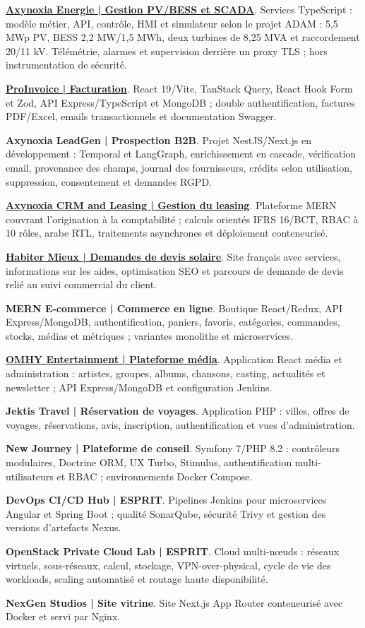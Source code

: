 \documentclass[11pt,a4paper]{article}
\newcommand{\project}[2]{\Needspace{3\baselineskip}\textbf{#1}. #2\par}
\begin{document}
\project{\href{https://energie.products.axynoxia.com}{Axynoxia Energie | Gestion PV/BESS et SCADA}}{Services TypeScript : modèle métier, API, contrôle, HMI et simulateur selon le projet ADAM : 5,5 MWp PV, BESS 2,2 MW/1,5 MWh, deux turbines de 8,25 MVA et raccordement 20/11 kV. Télémétrie, alarmes et supervision derrière un proxy TLS ; hors instrumentation de sécurité.}
\project{\href{https://invoice.products.axynoxia.com}{ProInvoice | Facturation}}{React 19/Vite, TanStack Query, React Hook Form et Zod, API Express/TypeScript et MongoDB ; double authentification, factures PDF/Excel, emails transactionnels et documentation Swagger.}
\project{Axynoxia LeadGen | Prospection B2B}{Projet NestJS/Next.js en développement : Temporal et LangGraph, enrichissement en cascade, vérification email, provenance des champs, journal des fournisseurs, crédits selon utilisation, suppression, consentement et demandes RGPD.}
\project{\href{https://crm-leasing.products.axynoxia.com}{Axynoxia CRM and Leasing | Gestion du leasing}}{Plateforme MERN couvrant l’origination à la comptabilité ; calculs orientés IFRS 16/BCT, RBAC à 10 rôles, arabe RTL, traitements asynchrones et déploiement conteneurisé.}
\project{\href{https://habiter-mieux.info/}{Habiter Mieux | Demandes de devis solaire}}{Site français avec services, informations sur les aides, optimisation SEO et parcours de demande de devis relié au suivi commercial du client.}
\project{MERN E-commerce | Commerce en ligne}{Boutique React/Redux, API Express/MongoDB, authentification, paniers, favoris, catégories, commandes, stocks, médias et métriques ; variantes monolithe et microservices.}
\project{\href{https://omhyfamily.com/}{OMHY Entertainment | Plateforme média}}{Application React média et administration : artistes, groupes, albums, chansons, casting, actualités et newsletter ; API Express/MongoDB et configuration Jenkins.}
\project{Jektis Travel | Réservation de voyages}{Application PHP : villes, offres de voyages, réservations, avis, inscription, authentification et vues d’administration.}
\project{New Journey | Plateforme de conseil}{Symfony 7/PHP 8.2 : contrôleurs modulaires, Doctrine ORM, UX Turbo, Stimulus, authentification multi-utilisateurs et RBAC ; environnements Docker Compose.}
\project{DevOps CI/CD Hub | ESPRIT}{Pipelines Jenkins pour microservices Angular et Spring Boot ; qualité SonarQube, sécurité Trivy et gestion des versions d’artefacts Nexus.}
\project{OpenStack Private Cloud Lab | ESPRIT}{Cloud multi-nœuds : réseaux virtuels, sous-réseaux, calcul, stockage, VPN-over-physical, cycle de vie des workloads, scaling automatisé et routage haute disponibilité.}
\project{NexGen Studios | Site vitrine}{Site Next.js App Router conteneurisé avec Docker et servi par Nginx.}
\end{document}
